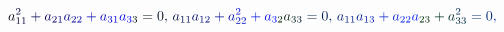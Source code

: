 \documentclass[12pt]{article}
\begin{document}
\makeatletter
\renewcommand*{\@textcolor}[3]{%
  \protect\leavevmode
  \begingroup
    \color#1{#2}#3%
  \endgroup
}
\makeatother
\begin{displaymath}
\mathcolor[RGB]{0,0,15}{a} _ { \mathcolor[RGB]{0,0,30}{1} \mathcolor[RGB]{0,0,45}{1} } ^ { \mathcolor[RGB]{0,0,60}{2} } \mathcolor[RGB]{0,0,75}{+} \mathcolor[RGB]{0,0,90}{a} _ { \mathcolor[RGB]{0,0,105}{2} \mathcolor[RGB]{0,0,120}{1} } \mathcolor[RGB]{0,0,135}{a} _ { \mathcolor[RGB]{0,0,150}{2} \mathcolor[RGB]{0,0,165}{2} } \mathcolor[RGB]{0,0,180}{+} \mathcolor[RGB]{0,0,195}{a} _ { \mathcolor[RGB]{0,0,210}{3} \mathcolor[RGB]{0,0,225}{1} } \mathcolor[RGB]{0,0,240}{a} _ { \mathcolor[RGB]{0,0,255}{3} \mathcolor[RGB]{0,15,0}{3} } \mathcolor[RGB]{0,15,15}{=} \mathcolor[RGB]{0,15,30}{0} \mathcolor[RGB]{0,15,45}{,} \mathcolor[RGB]{0,15,60}{\,
a} _ { \mathcolor[RGB]{0,15,75}{1} \mathcolor[RGB]{0,15,90}{1} } \mathcolor[RGB]{0,15,105}{a} _ { \mathcolor[RGB]{0,15,120}{1} \mathcolor[RGB]{0,15,135}{2} } \mathcolor[RGB]{0,15,150}{+} \mathcolor[RGB]{0,15,165}{a} _ { \mathcolor[RGB]{0,15,180}{2} \mathcolor[RGB]{0,15,195}{2} } ^ { \mathcolor[RGB]{0,15,210}{2} } \mathcolor[RGB]{0,15,225}{+} \mathcolor[RGB]{0,15,240}{a} _ { \mathcolor[RGB]{0,15,255}{3} \mathcolor[RGB]{0,30,0}{2} } \mathcolor[RGB]{0,30,15}{a} _ { \mathcolor[RGB]{0,30,30}{3} \mathcolor[RGB]{0,30,45}{3} } \mathcolor[RGB]{0,30,60}{=} \mathcolor[RGB]{0,30,75}{0} \mathcolor[RGB]{0,30,90}{,} \mathcolor[RGB]{0,30,105}{\,
a} _ { \mathcolor[RGB]{0,30,120}{1} \mathcolor[RGB]{0,30,135}{1} } \mathcolor[RGB]{0,30,150}{a} _ { \mathcolor[RGB]{0,30,165}{1} \mathcolor[RGB]{0,30,180}{3} } \mathcolor[RGB]{0,30,195}{+} \mathcolor[RGB]{0,30,210}{a} _ { \mathcolor[RGB]{0,30,225}{2} \mathcolor[RGB]{0,30,240}{2} } \mathcolor[RGB]{0,30,255}{a} _ { \mathcolor[RGB]{0,45,0}{2} \mathcolor[RGB]{0,45,15}{3} } \mathcolor[RGB]{0,45,30}{+} \mathcolor[RGB]{0,45,45}{a} _ { \mathcolor[RGB]{0,45,60}{3} \mathcolor[RGB]{0,45,75}{3} } ^ { \mathcolor[RGB]{0,45,90}{2} } \mathcolor[RGB]{0,45,105}{=} \mathcolor[RGB]{0,45,120}{0} \mathcolor[RGB]{0,45,135}{,} \mathcolor[RGB]{0,45,150}{\,
}
\end{displaymath}
\end{document}
